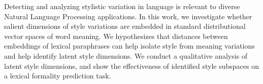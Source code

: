 Detecting and analyzing stylistic variation in language is relevant to diverse Natural Language Processing applications. In this work, we investigate whether salient dimensions of style variations are embedded in standard distributional vector spaces of word meaning. We hypothesizes that distances between embeddings of lexical paraphrases can help isolate style from meaning variations and help identify latent style dimensions. We conduct a qualitative analysis of latent style dimensions, and show the effectiveness of identified style subspaces on a lexical formality prediction task.
